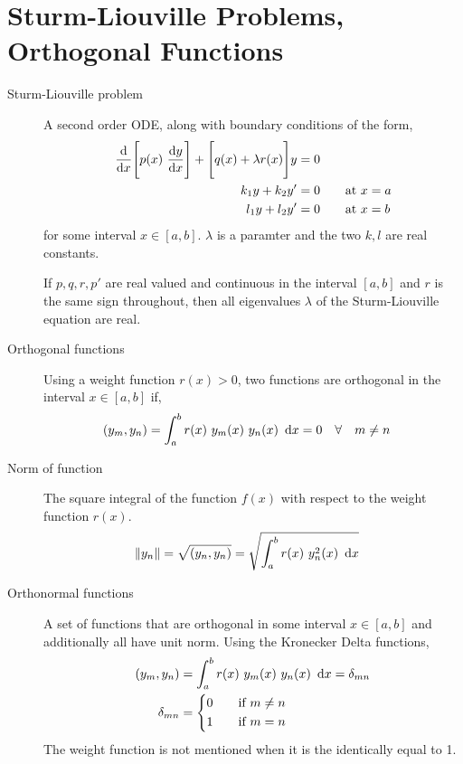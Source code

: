 \section{Sturm-Liouville Problems, Orthogonal Functions}

\begin{description}
    \item[Sturm-Liouville problem] A second order ODE, along with boundary conditions
        of the form,
        \begin{align}
            \diff{}{x}\Bigg[p(x)\ \diff yx\Bigg] +
            \Bigg[ q(x) + \lambda r(x) \Bigg]y & = 0                         \\
            k_1 y + k_2 y'                     & = 0 \qquad \text{at}\ x = a \\
            l_1 y + l_2 y'                     & = 0 \qquad \text{at}\ x = b
        \end{align}
        for some interval $ x \in [a,b] $. $ \lambda $ is a paramter and the two
        $ k, l $ are real constants. \par
        If $ p,q,r,p' $ are real valued and continuous in the interval $ [a,b] $ and
        $ r $ is the same sign throughout, then all eigenvalues $ \lambda $ of the
        Sturm-Liouville equation are real.

    \item[Orthogonal functions] Using a weight function $ r(x) > 0 $, two functions
        are orthogonal in the interval $ x \in [a, b] $ if,
        \begin{align}
            (y_m, y_n) & = \int_{a}^{b} r(x)\ y_m(x)\ y_n(x)\ \dl x = 0 &
                       & \forall\quad m \neq n
        \end{align}

    \item[Norm of function] The square integral of the function $ f(x) $ with respect
        to the weight function $ r(x) $.
        \begin{align}
            \lVert y_n \rVert = \sqrt{(y_n, y_n)} &
            = \sqrt{\int_{a}^{b} r(x)\ y_n^2(x)\ \dl x}
        \end{align}

    \item[Orthonormal functions] A set of functions that are orthogonal in some interval
        $ x \in [a, b] $ and additionally all have unit norm. Using the Kronecker Delta
        functions,
        \begin{align}
            (y_m, y_n)  & = \int_{a}^{b} r(x)\ y_m(x)\ y_n(x)\ \dl x = \delta_{mn} \\
            \delta_{mn} & = \begin{dcases}
                                0 & \quad \text{if}\ m \neq n \\
                                1 & \quad \text{if}\ m = n    \\
                            \end{dcases}
        \end{align}
        The weight function is not mentioned when it is the identically equal to 1.


\end{description}
